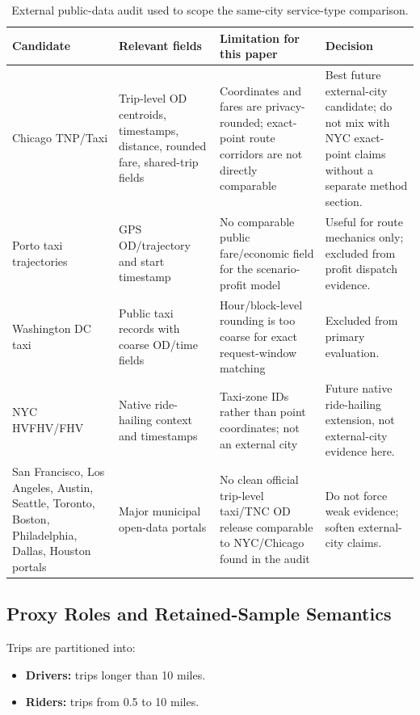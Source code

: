 \documentclass[journal]{IEEEtran}
\begin{document}
\begin{table}[!t]
\caption{External public-data audit used to scope the same-city service-type comparison.}
\label{tab:external_data_audit}
\centering
\footnotesize
\begin{tabularx}{\textwidth}{|L{0.20\textwidth}|L{0.29\textwidth}|L{0.27\textwidth}|Y|}
\hline
Candidate & Relevant fields & Limitation for this paper & Decision \\
\hline
Chicago TNP/Taxi & Trip-level OD centroids, timestamps, distance, rounded fare, shared-trip fields & Coordinates and fares are privacy-rounded; exact-point route corridors are not directly comparable & Best future external-city candidate; do not mix with NYC exact-point claims without a separate method section. \\
\hline
Porto taxi trajectories & GPS OD/trajectory and start timestamp & No comparable public fare/economic field for the scenario-profit model & Useful for route mechanics only; excluded from profit dispatch evidence. \\
\hline
Washington DC taxi & Public taxi records with coarse OD/time fields & Hour/block-level rounding is too coarse for exact request-window matching & Excluded from primary evaluation. \\
\hline
NYC HVFHV/FHV & Native ride-hailing context and timestamps & Taxi-zone IDs rather than point coordinates; not an external city & Future native ride-hailing extension, not external-city evidence here. \\
\hline
San Francisco, Los Angeles, Austin, Seattle, Toronto, Boston, Philadelphia, Dallas, Houston portals & Major municipal open-data portals & No clean official trip-level taxi/TNC OD release comparable to NYC/Chicago found in the audit & Do not force weak evidence; soften external-city claims. \\
\hline
\end{tabularx}
\end{table}

\subsection{Proxy Roles and Retained-Sample Semantics}
Trips are partitioned into:
\begin{itemize}
    \item \textbf{Drivers:} trips longer than 10 miles.
    \item \textbf{Riders:} trips from 0.5 to 10 miles.
\end{itemize}
\end{document}
